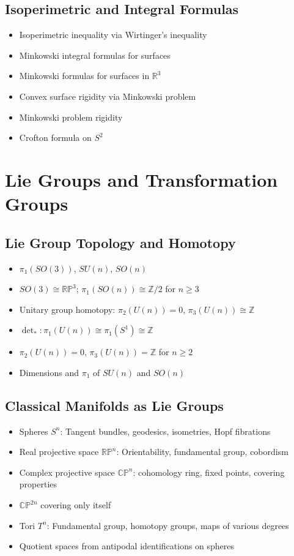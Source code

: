\documentclass{amsart}
\begin{document}
\subsection{Isoperimetric and Integral Formulas}
\begin{itemize}
    \item Isoperimetric inequality via Wirtinger's inequality
    \item Minkowski integral formulas for surfaces
    \item Minkowski formulas for surfaces in $\mathbb{R}^3$
    \item Convex surface rigidity via Minkowski problem
    \item Minkowski problem rigidity
    \item Crofton formula on $S^2$
    \end{itemize}

\section{Lie Groups and Transformation Groups}

\subsection{Lie Group Topology and Homotopy}
\begin{itemize}
    \item $\pi_1(SO(3))$, $SU(n)$, $SO(n)$
    \item $SO(3) \cong \mathbb{RP}^3$; $\pi_1(SO(n)) \cong \mathbb{Z}/2$ for $n \geq 3$
    \item Unitary group homotopy: $\pi_2(U(n)) = 0$, $\pi_3(U(n)) \cong \mathbb{Z}$
    \item $\det_*: \pi_1(U(n)) \cong \pi_1(S^1) \cong \mathbb{Z}$
    \item $\pi_2(U(n)) = 0$, $\pi_3(U(n)) = \mathbb{Z}$ for $n \geq 2$
    \item Dimensions and $\pi_1$ of $SU(n)$ and $SO(n)$
    \end{itemize}

\subsection{Classical Manifolds as Lie Groups}
\begin{itemize}
    \item Spheres $S^n$: Tangent bundles, geodesics, isometries, Hopf fibrations
    \item Real projective space $\mathbb{RP}^n$: Orientability, fundamental group, cobordism
    \item Complex projective space $\mathbb{CP}^n$: cohomology ring, fixed points, covering properties
    \item $\mathbb{CP}^{2n}$ covering only itself
    \item Tori $T^n$: Fundamental group, homotopy groups, maps of various degrees
    \item Quotient spaces from antipodal identifications on spheres
    \end{itemize}
\end{document}
